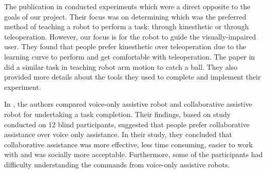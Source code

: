 The publication in \cite{kinestheticteaching} conducted experiments which were a direct opposite to the goals of our project. 
Their focus was on determining which was the preferred method of teaching a robot to perform a task: through kinesthetic or through teleoperation. 
However, our focus is for the robot to guide the visually-impaired user. 
They found that people prefer kinesthetic over teleoperation due to the learning curve to perform and get comfortable with teleoperation. 
The paper in \cite{humanteacher} did a similar task in teaching robot arm motion to catch a ball. 
They also provided more details about the tools they used to complete and implement their experiment. 

In \cite{robotassist}, the authors compared voice-only assistive robot and collaborative assistive robot for undertaking a task completion. 
Their findings, based on study conducted on 12 blind participants, suggested that people prefer collaborative assistance over voice only assistance.
In their study, they concluded that collaborative assistance was more effective, less time consuming, easier to work with and was socially more acceptable. 
Furthermore, some of the participants had difficulty understanding the commands from voice-only assistive robots. 